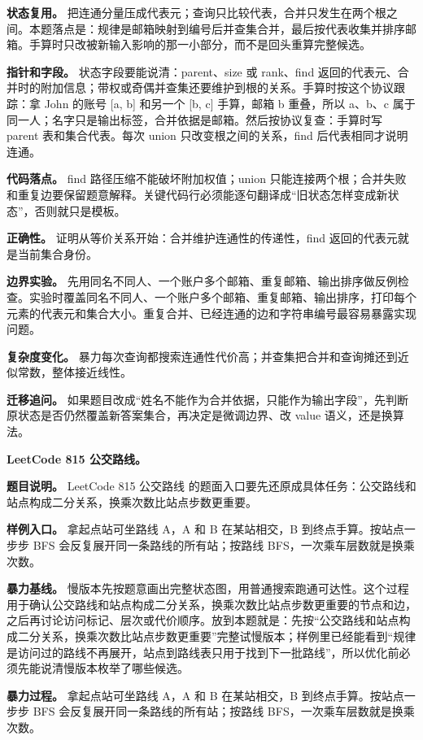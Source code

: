 \textbf{状态复用。} 把连通分量压成代表元；查询只比较代表，合并只发生在两个根之间。本题落点是：规律是邮箱映射到编号后并查集合并，最后按代表收集并排序邮箱。手算时只改被新输入影响的那一小部分，而不是回头重算完整候选。

\textbf{指针和字段。} 状态字段要能说清：parent、size 或 rank、find 返回的代表元、合并时的附加信息；带权或奇偶并查集还要维护到根的关系。手算时按这个协议跟踪：拿 John 的账号 [a, b] 和另一个 [b, c] 手算，邮箱 b 重叠，所以 a、b、c 属于同一人；名字只是输出标签，合并依据是邮箱。然后按协议复查：手算时写 parent 表和集合代表。每次 union 只改变根之间的关系，find 后代表相同才说明连通。

\textbf{代码落点。} find 路径压缩不能破坏附加权值；union 只能连接两个根；合并失败和重复边要保留题意解释。关键代码行必须能逐句翻译成“旧状态怎样变成新状态”，否则就只是模板。

\textbf{正确性。} 证明从等价关系开始：合并维护连通性的传递性，find 返回的代表元就是当前集合身份。

\textbf{边界实验。} 先用同名不同人、一个账户多个邮箱、重复邮箱、输出排序做反例检查。实验时覆盖同名不同人、一个账户多个邮箱、重复邮箱、输出排序，打印每个元素的代表元和集合大小。重复合并、已经连通的边和字符串编号最容易暴露实现问题。

\textbf{复杂度变化。} 暴力每次查询都搜索连通性代价高；并查集把合并和查询摊还到近似常数，整体接近线性。

\textbf{迁移追问。} 如果题目改成“姓名不能作为合并依据，只能作为输出字段”，先判断原状态是否仍然覆盖新答案集合，再决定是微调边界、改 value 语义，还是换算法。

\noindent\textbf{LeetCode 815 公交路线。}

\textbf{题目说明。} LeetCode 815 公交路线 的题面入口要先还原成具体任务：公交路线和站点构成二分关系，换乘次数比站点步数更重要。

\textbf{样例入口。} 拿起点站可坐路线 A，A 和 B 在某站相交，B 到终点手算。按站点一步步 BFS 会反复展开同一条路线的所有站；按路线 BFS，一次乘车层数就是换乘次数。

\textbf{暴力基线。} 慢版本先按题意画出完整状态图，用普通搜索跑通可达性。这个过程用于确认公交路线和站点构成二分关系，换乘次数比站点步数更重要的节点和边，之后再讨论访问标记、层次或代价顺序。放到本题就是：先按“公交路线和站点构成二分关系，换乘次数比站点步数更重要”完整试慢版本；样例里已经能看到“规律是访问过的路线不再展开，站点到路线表只用于找到下一批路线”，所以优化前必须先能说清慢版本枚举了哪些候选。

\textbf{暴力过程。} 拿起点站可坐路线 A，A 和 B 在某站相交，B 到终点手算。按站点一步步 BFS 会反复展开同一条路线的所有站；按路线 BFS，一次乘车层数就是换乘次数。

